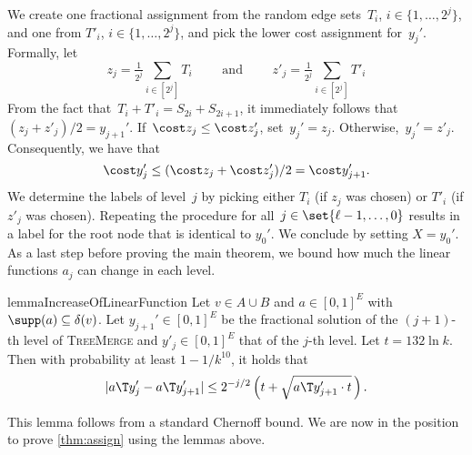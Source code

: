 We create one fractional assignment from the random edge sets~$T_{i}$, $i\in\{1,\dotsc,2^j\}$,
and one from $T'_{i}$, $i\in\{1,\dotsc,2^j\}$, and pick the lower cost assignment for~$y_{j}'$.
Formally, let 
\begin{equation*}
    z_{j} = \tfrac{1}{2^{j}} \sum_{i \in [2^j]} T_{i} \qquad \text{ and } \qquad
    z'_{j} = \tfrac{1}{2^{j}} \sum_{i \in [2^j]} T'_{i} 
\end{equation*}
From the fact that~$T_{i} + T'_{i} = S_{2i} + S_{2i+1}$, it immediately follows that $(z_{j} + z'_{j})/2 = y_{j+1}'$.
If~$\cost z_j \le \cost z'_j$, set~$y_{j}' = z_{j}$. Otherwise,~$y_{j}' = z'_{j}$.
Consequently, we have that
\begin{equation}
    \label{eq:rdr-cost-of-level-j-assignment}
    \cost y_{j}' \le (\cost z_{j} + \cost z'_{j})/2 = \cost y_{j+1}'.
\end{equation}
We determine the labels of level~$j$ by picking either $T_i$ (if $z_j$ was chosen) or $T'_i$ (if $z'_j$ was chosen).
Repeating the procedure for all~$j \in \set{\ell-1,\dotsc,0}$
results in a label for the root node that is identical to $y_0'$. We conclude by setting $X = y_0'$.
As a last step before proving the main theorem, we 
bound how much the linear functions $a_j$ can change in each level.

\begin{restatable}{lemma}{IncreaseOfLinearFunction}
    \label{lem:linear-function-increase-per-level}
    Let $v\in A\cup B$ and $a \in [0, 1]^E$ with $\supp(a) \subseteq \delta(v)$.
    Let $y_{j+1}' \in [0,1]^E$
    be the fractional solution of the $(j+1)$-th
    level of \textsc{TreeMerge}
    and $y'_{j}\in [0,1]^E$
    that of the $j$-th level.
    Let $t= 132 \ln k$.
    Then with probability at least $1 - 1/k^{10}$, it holds that
    \begin{equation}
        \label{eq:lfipl-bound-on-lf-increase}
        |a\T y_j' - a\T y_{j+1}'| \le 2^{-j/2} \left(t + \sqrt{a\T y_{j+1}' \cdot t}\,\right).
    \end{equation}
\end{restatable}
This lemma follows from a standard Chernoff bound.
We are now in the position to prove \cref{thm:assign} using the lemmas above.


